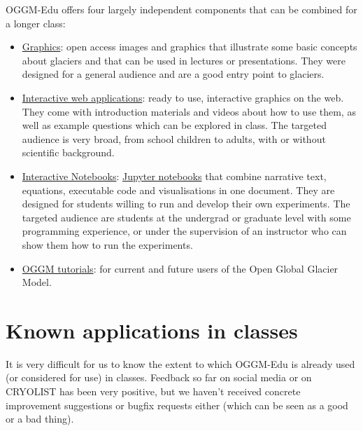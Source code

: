 OGGM-Edu offers four largely independent components that can be combined for a longer class:
\begin{itemize}[nosep]
\item {} 
\href{https://edu.oggm.org/en/latest/\#title-graphics}{Graphics}: open access images and graphics that
illustrate some basic concepts about glaciers and that can be used in lectures or presentations.
They were designed for a general audience and are a good entry point to glaciers.

\item {} 
\href{https://edu.oggm.org/en/latest/\#title-apps}{Interactive web applications}: ready to use, interactive graphics on the web.
They come with introduction materials and videos about how to use them, as well as example questions which can be explored in class.
The targeted audience is very broad, from school children to adults, with
or without scientific background.

\item {} 
\href{https://edu.oggm.org/en/latest/\#title-notebooks}{Interactive Notebooks}: \href{https://jupyter.org/}{Jupyter notebooks} that combine narrative text,
equations, executable code and visualisations in one document. They are designed for students willing to run and develop their
own experiments. The targeted audience are students at the undergrad or graduate level with some
programming experience, or under the supervision of an instructor who can show them how to run the experiments.

\item {} 
\href{https://edu.oggm.org/en/latest/oggm\_tuto.html}{OGGM tutorials}: for current and future users of the Open Global Glacier Model.

\end{itemize}


\section{Known applications in classes}

It is very difficult for us to know the extent to which OGGM-Edu is already used (or considered for use) in classes.
Feedback so far on social media or on CRYOLIST has been very positive, but we haven’t received concrete improvement suggestions
or bugfix requests either (which can be seen as a good or a bad thing).

